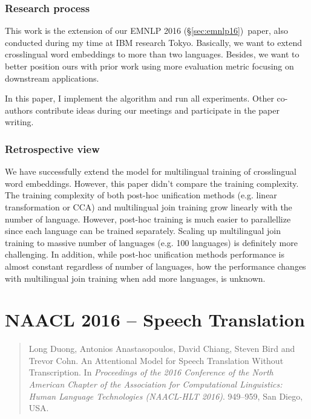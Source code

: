 \documentclass[12pt,twoside,final,hidelinks]{ltthesis}
\theoremstyle{definition}
\newcommand\emnlpvi{EMNLP 2016 (\S\ref{sec:emnlp16})}
\begin{document}
\subsubsection{Research process}
This work is the extension of our \emnlpvi\ paper, also conducted during my time at IBM research Tokyo. Basically, we want to extend crosslingual word embeddings to more than two languages. Besides, we want to better position ours with prior work using more evaluation metric focusing on downstream applications. 

In this paper, I implement the algorithm and run all experiments. Other co-authors contribute ideas during our meetings and participate in the paper writing. 

\subsubsection{Retrospective view}
We have successfully extend the model for multilingual training of crosslingual word embeddings. However, this paper didn't compare the training complexity. 
The training complexity of both post-hoc unification methods (e.g. linear transformation or CCA) and multilingual join training grow linearly with the 
number of language. However, post-hoc training is much easier to parallellize since each language can be trained separately. Scaling up multilingual join 
training to massive number of languages (e.g. 100 languages) is definitely more challenging. In addition, while post-hoc unification methods performance 
is almost constant regardless of number of languages, how the performance changes with multilingual join training when add more languages, is unknown. 




\section{NAACL 2016 -- Speech Translation}
\label{sec:naacl16}
\begin{quote}
Long Duong, Antonios Anastasopoulos, David Chiang, Steven Bird and Trevor Cohn. An Attentional Model for Speech Translation Without Transcription. In\textit{ Proceedings of the 2016 Conference of the North American Chapter of the Association for Computational Linguistics: Human Language Technologies (NAACL-HLT 2016)}. 949--959, San Diego, USA.
\end{quote}
\end{document}
